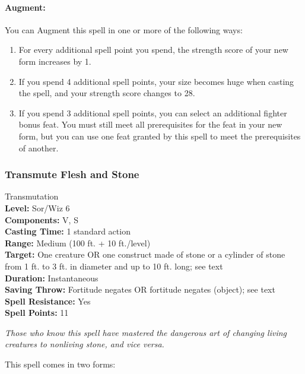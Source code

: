 \paragraph{Augment:} You can Augment this spell in one or more of the following ways:
\begin{enumerate}
 \item For every additional spell point you spend, the strength score of your new form increases by 1.
 \item If you spend 4 additional spell points, your size becomes huge when casting the spell, and your strength score changes to 28.
 \item If you spend 3 additional spell points, you can select an additional fighter bonus feat. 
 You must still meet all prerequisites for the feat in your new form, but you can use one feat granted by this spell to meet the prerequisites of another.
\end{enumerate}
\subsubsection{Transmute Flesh and Stone}
\label{Spell:TransmuteFleshAndStone}
Transmutation
\\ \textbf{Level:} Sor/Wiz 6
\\ \textbf{Components:} V, S
\\ \textbf{Casting Time:} 1 standard action
\\ \textbf{Range:} Medium (100 ft. + 10 ft./level)
\\ \textbf{Target:} One creature OR one construct made of stone or a cylinder of stone from 1 ft. to 3 ft. in diameter and up to 10 ft. long; see text
\\ \textbf{Duration:} Instantaneous
\\ \textbf{Saving Throw:} Fortitude negates OR fortitude negates (object); see text
\\ \textbf{Spell Resistance:} Yes
\\ \textbf{Spell Points:} 11

\emph{Those who know this spell have mastered the dangerous art of changing living creatures to nonliving stone, and vice versa.}

This spell comes in two forms:

